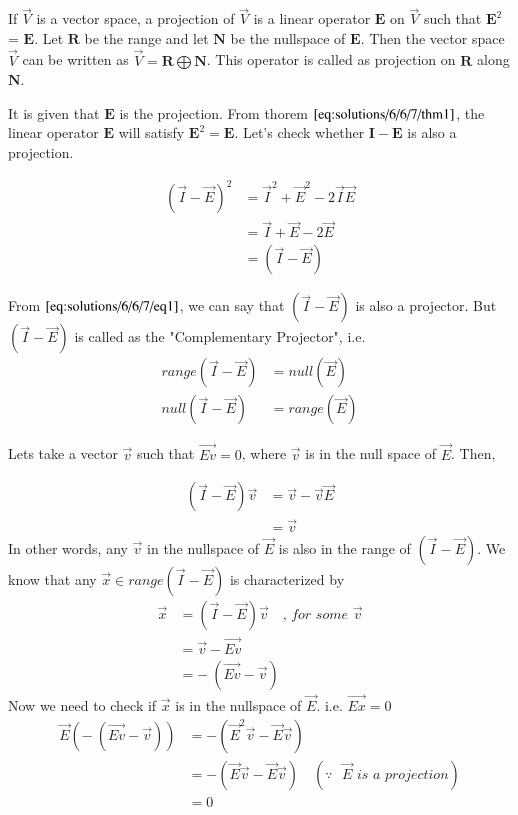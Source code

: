 	
	\begin{theorem}\label{eq:solutions/6/6/7/thm1}
		If $\vec{V}$ is a vector space, a projection of $\vec{V}$ is a linear operator $\mathbf{E}$ on $\vec{V}$ such that $\mathbf{E}^2$ = $\mathbf{E}$. Let $\mathbf{R}$ be the range and let $\mathbf{N}$ be the nullspace of $\mathbf{E}$. Then the vector space $\vec{V}$ can be written as $\Vec{V} = \mathbf{R} \bigoplus \mathbf{N}$. This operator is called as projection on $\mathbf{R}$ along $\mathbf{N}$. 
	\end{theorem}
	
	
	It is given that $\mathbf{E}$ is the projection. From thorem $\ref{eq:solutions/6/6/7/thm1}$, the linear operator $\mathbf{E}$ will satisfy $\mathbf{E}^{2} = \mathbf{E}$. Let's check whether $\mathbf{I-E}$ is also a projection. 
	
	\begin{align}\label{eq:solutions/6/6/7/eq1}
		(\Vec{I}-\vec{E})^{2} &= \Vec{I}^{2} + \Vec{E}^{2} - 2\Vec{I}\Vec{E} \nonumber \\
		&= \Vec{I} + \Vec{E} - 2\Vec{E} \nonumber \\
		&= (\Vec{I} - \Vec{E})
	\end{align}
	
	From $\eqref{eq:solutions/6/6/7/eq1}$, we can say that $(\Vec{I} - \Vec{E})$ is also a projector. But $(\Vec{I} - \Vec{E})$ is called as the "Complementary Projector", i.e.
	\begin{align}
		range(\Vec{I} - \Vec{E}) &= null(\Vec{E}) \label{eq:solutions/6/6/7/eq2}\\
		null(\Vec{I} - \Vec{E}) &= range(\Vec{E}) \label{eq:solutions/6/6/7/eq3}
	\end{align}
	
	Lets take a vector $\Vec{v}$ such that $\Vec{Ev} = 0$, where $\vec{v}$ is in the null space of $\vec{E}$. Then, 
	
	\begin{align}
		(\Vec{I} - \Vec{E})\vec{v} &= \vec{v} - \vec{v}\vec{E} \nonumber \\
		&= \vec{v}
	\end{align}
	In other words, any $\Vec{v}$ in the nullspace of $\Vec{E}$ is also in the range of $(\Vec{I} - \Vec{E})$.  
	We know that any $\vec{x} \in range(\Vec{I} - \Vec{E})$ is characterized by
	\begin{align}
		\Vec{x} &= (\Vec{I} - \Vec{E})\Vec{v} \quad \textit{, for some $\Vec{v}$} \nonumber \\
		&= \Vec{v} - \Vec{Ev} \nonumber \\
		&= - \ (\Vec{Ev} - \Vec{v})
	\end{align}
	Now we need to check if $\Vec{x}$ is in the nullspace of $\Vec{E}$. i.e. $\Vec{Ex} = 0$
	\begin{align}
		\Vec{E}(- \ (\Vec{Ev} - \Vec{v})) &= -(\Vec{E}^{2}\Vec{v} - \Vec{E}\Vec{v}) \nonumber \\
		&= -(\Vec{E}\Vec{v} - \Vec{E}\Vec{v}) \quad (\textit{$\because$ $\vec{E}$ is a projection}) \nonumber \\
		&= 0
	\end{align}
	
